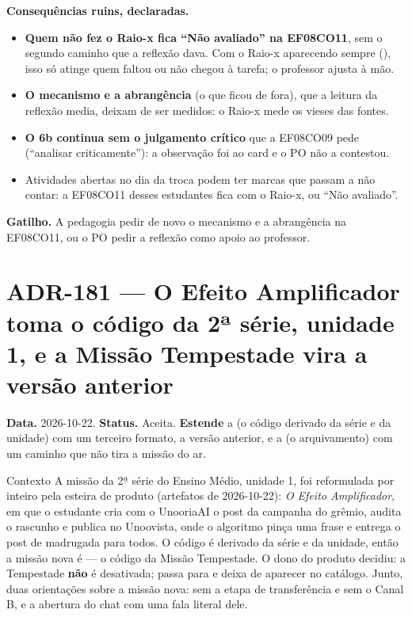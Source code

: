 \textbf{Consequências ruins, declaradas.}

\begin{itemize}
  \item \textbf{Quem não fez o Raio-x fica \enquote{Não avaliado} na
    EF08CO11}, sem o segundo caminho que a reflexão dava. Com o Raio-x
    aparecendo sempre (), isso só atinge quem faltou ou não
    chegou à tarefa; o professor ajusta à mão.
  \item \textbf{O mecanismo e a abrangência} (o que ficou de fora), que a
    leitura da reflexão media, deixam de ser medidos: o Raio-x mede os vieses
    das fontes.
  \item \textbf{O 6b continua sem o julgamento crítico} que a EF08CO09 pede
    (\enquote{analisar criticamente}): a observação foi ao card e o PO não
    a contestou.
  \item Atividades abertas no dia da troca podem ter marcas  que
    passam a não contar: a EF08CO11 desses estudantes fica com o Raio-x, ou
    \enquote{Não avaliado}.
\end{itemize}

\textbf{Gatilho.} A pedagogia pedir de novo o mecanismo e a abrangência na
EF08CO11, ou o PO pedir a reflexão como apoio ao professor.

\section{ADR-181 --- O Efeito Amplificador toma o código da 2ª série, unidade 1, e a Missão Tempestade vira a versão anterior}
\label{adr:exp02em1b-efeito-amplificador}

\textbf{Data.} 2026-10-22. \textbf{Status.} Aceita. \textbf{Estende} a
 (o código derivado da série e da unidade) com um terceiro
formato, a versão anterior, e a  (o arquivamento) com um
caminho que não tira a missão do ar.

\begin{especificacao}{Contexto}
A missão da 2ª série do Ensino Médio, unidade 1, foi reformulada por inteiro
pela esteira de produto (artefatos de 2026-10-22): \emph{O Efeito
Amplificador}, em que o estudante cria com o UnooriaAI o post da campanha do
grêmio, audita o rascunho e publica no Unoovista, onde o algoritmo pinça uma
frase e entrega o post de madrugada para todos. O código é derivado da série e
da unidade, então a missão nova é  --- o código da Missão
Tempestade. O dono do produto decidiu: a Tempestade \textbf{não} é desativada;
passa para  e deixa de aparecer no catálogo. Junto, duas
orientações sobre a missão nova: sem a etapa de transferência e sem o Canal B,
e a abertura do chat com uma fala literal dele.
\end{especificacao}

